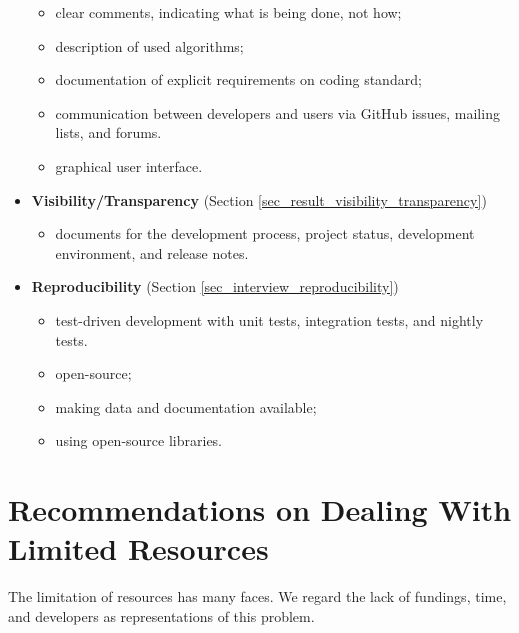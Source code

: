 \begin{itemize}
\begin{itemize}
    \item clear comments, indicating what is being done, not how;
    \item description of used algorithms;
    \item documentation of explicit requirements on coding standard;
    \item communication between developers and users via GitHub issues, mailing lists, and forums.
    \item graphical user interface.
\end{itemize}
\item \textbf{Visibility/Transparency} (Section \ref{sec_result_visibility_transparency})
\begin{itemize}
    \item documents for the development process, project status, development environment, and release notes.
\end{itemize}
\item \textbf{Reproducibility} (Section \ref{sec_interview_reproducibility})
\begin{itemize}
    \item test-driven development with unit tests, integration tests, and nightly tests.
    \item open-source;
    \item making data and documentation available;
    \item using open-source libraries.
\end{itemize}
\end{itemize}

\section{Recommendations on Dealing With Limited Resources}
\label{sec_recommendations_limited_resources}

The limitation of resources has many faces. We regard the lack of fundings, time, and developers as representations of this problem.


